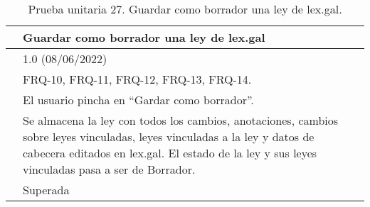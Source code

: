 \begin{table}[H]
\begin{center}
\begin{tabular}{|p{3cm}|p{10cm}|} \hline
\centering {\bf PU-27} & Guardar como borrador una ley de lex.gal  \\ \hline\hline
\centering {\bf Versión} & 1.0 (08/06/2022) \\ \hline
\centering {\bf Dependencias} & FRQ-10, FRQ-11, FRQ-12, FRQ-13, FRQ-14. \\ \hline
\centering {\bf Descripción} &  El usuario pincha en ``Gardar como borrador''. \\ \hline
\centering {\bf Criterio de aceptación} & Se almacena la ley con todos los cambios, anotaciones, cambios sobre leyes vinculadas, leyes vinculadas a la ley y datos de cabecera editados en lex.gal. El estado de la ley y sus leyes vinculadas pasa a ser de Borrador. \\ \hline
\centering {\bf Estado} & Superada \\ \hline
\end{tabular}
\caption{Prueba unitaria 27. Guardar como borrador una ley de lex.gal.}
\label{enlacePU27}
\end{center}
\end{table}